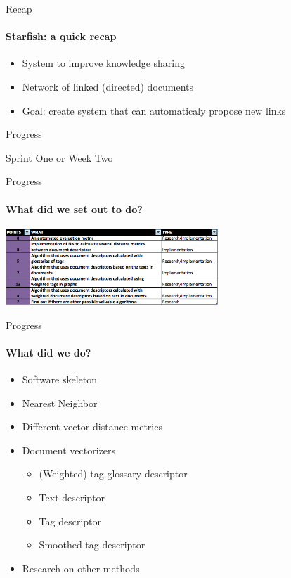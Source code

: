 
\begin{frame}[t]{Recap}

\framesubtitle{Starfish: a quick recap}

\begin{itemize}
  \item System to improve knowledge sharing
  \item Network of linked (directed) documents
  \item Goal: create system that can automaticaly propose new links
\end{itemize}


\end{frame}




\begin{frame}[t]{Progress}

  \huge{Sprint One or Week Two}

\end{frame}




\begin{frame}[t]{Progress}

\framesubtitle{What did we set out to do?}

\includegraphics[width=8cm]{sprintt}

\end{frame}

\begin{frame}[t]{Progress}

\framesubtitle{What did we do?}

\begin{itemize}
\item Software skeleton
\item Nearest Neighbor
\item Different vector distance metrics
\item Document vectorizers \\
  \begin{itemize}
    \item (Weighted) tag glossary descriptor
    \item Text descriptor
    \item Tag descriptor
    \item Smoothed tag descriptor
  \end{itemize}
\item Research on other methods
\end{itemize}

\end{frame}



